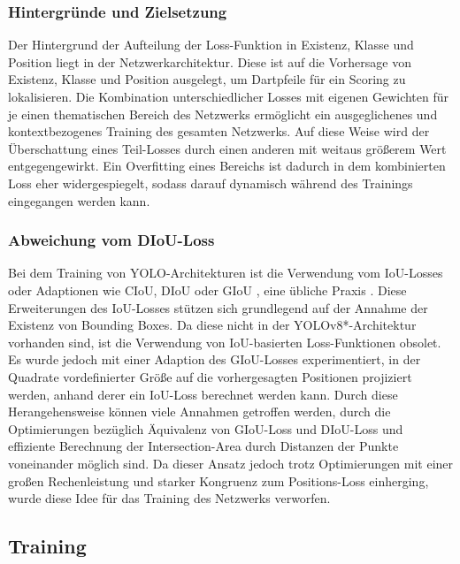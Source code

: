 \subsubsection{Hintergründe und Zielsetzung}

Der Hintergrund der Aufteilung der Loss-Funktion in Existenz, Klasse und Position liegt in der Netzwerkarchitektur. Diese ist auf die Vorhersage von Existenz, Klasse und Position ausgelegt, um Dartpfeile für ein Scoring zu lokalisieren. Die Kombination unterschiedlicher Losses mit eigenen Gewichten für je einen thematischen Bereich des Netzwerks ermöglicht ein ausgeglichenes und kontextbezogenes Training des gesamten Netzwerks. Auf diese Weise wird der Überschattung eines Teil-Losses durch einen anderen mit weitaus größerem Wert entgegengewirkt. Ein Overfitting eines Bereichs ist dadurch in dem kombinierten Loss eher widergespiegelt, sodass darauf dynamisch während des Trainings eingegangen werden kann.

\subsubsection{Abweichung vom DIoU-Loss}

Bei dem Training von YOLO-Architekturen ist die Verwendung vom IoU-Losses oder Adaptionen wie CIoU, DIoU oder GIoU \cite{diou_losses}, eine übliche Praxis \cite{yolov1,yolov8_paper,yolo_training_giou}. Diese Erweiterungen des IoU-Losses stützen sich grundlegend auf der Annahme der Existenz von Bounding Boxes. Da diese nicht in der YOLOv8*-Architektur vorhanden sind, ist die Verwendung von IoU-basierten Loss-Funktionen obsolet. Es wurde jedoch mit einer Adaption des GIoU-Losses experimentiert, in der Quadrate vordefinierter Größe auf die vorhergesagten Positionen projiziert werden, anhand derer ein IoU-Loss berechnet werden kann. Durch diese Herangehensweise können viele Annahmen getroffen werden, durch die Optimierungen bezüglich Äquivalenz von GIoU-Loss und DIoU-Loss und effiziente Berechnung der Intersection-Area durch Distanzen der Punkte voneinander möglich sind. Da dieser Ansatz jedoch trotz Optimierungen mit einer großen Rechenleistung und starker Kongruenz zum Positions-Loss einherging, wurde diese Idee für das Training des Netzwerks verworfen.


\subsection{Training}
\label{sec:nn_training}

